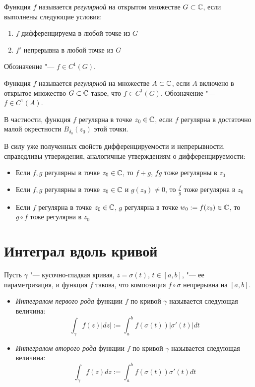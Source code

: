 \begin{definition}
	Функция $f$ называется \textit{регулярной} на открытом множестве $G \subset \mathbb{C}$, если выполнены следующие условия:
	\begin{enumerate}
		\item $f$ дифференцируема в любой точке из $G$
		\item $f'$ непрерывна в любой точке из $G$
	\end{enumerate}

	Обозначение "--- $f \in C^1(G)$.
\end{definition}

\begin{definition}
	Функция $f$ называется \textit{регулярной} на множестве $A \subset \mathbb{C}$, если $A$ включено в открытое множество $G \subset \mathbb{C}$ такое, что $f \in C^1(G)$. Обозначение "--- $f \in C^1(A)$.
\end{definition}

\begin{note}
	В частности, функция $f$ регулярна в точке $z_0 \in \mathbb{C}$, если $f$ регулярна в достаточно малой окрестности $B_{\delta_0}(z_0)$ этой точки.
\end{note}

\begin{note}
	В силу уже полученных свойств дифференцируемости и непрерывности, справедливы утверждения, аналогичные утверждениям о дифференцируемости:
	\begin{itemize}
		\item Если $f, g$ регулярны в точке $z_0 \in \mathbb{C}$, то $f + g$, $fg$ тоже регулярны в $z_0$
		\item Если $f, g$ регулярны в точке $z_0 \in \mathbb{C}$ и $g(z_0) \ne 0$, то $\frac fg$ тоже регулярна в $z_0$
		\item Если $f$ регулярна в точке $z_0 \in \mathbb{C}$, $g$ регулярна в точке $w_0 := f(z_0) \in \mathbb{C}$, то $g \circ f$ тоже регулярна в $z_0$
	\end{itemize}
\end{note}

\section{Интеграл вдоль кривой}

\begin{definition}
	Пусть $\gamma$ "--- кусочно-гладкая кривая, $z = \sigma(t)$, $t \in [a, b]$, "--- ее параметризация, и функция $f$ такова, что композиция $f\circ\sigma$ непрерывна на $[a, b]$.
	\begin{itemize}
		\item \textit{Интегралом первого рода} функции $f$ по кривой $\gamma$ называется следующая величина:
		\[\int_{\gamma}f(z)|dz| := \int_a^bf(\sigma(t))|\sigma'(t)|dt\]
		\item \textit{Интегралом второго рода} функции $f$ по кривой $\gamma$ называется следующая величина:
		\[\int_{\gamma}f(z)dz := \int_a^bf(\sigma(t))\sigma'(t)dt\]
	\end{itemize}
\end{definition}

